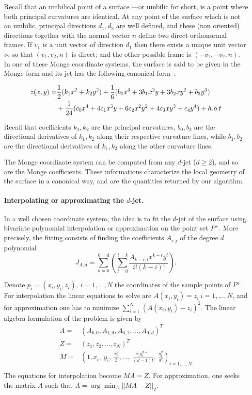Recall that an umbilical point of a surface ---or umbilic for short,
is a point where both principal curvatures are identical.  At any
point of the surface which is not an umbilic, principal directions
$d_1, d_2$ are well defined, and these (non oriented) directions
together with the normal vector $n$ define two direct orthonormal
frames. If $v_1$ is a unit vector of direction $d_1$ then there exists
a unique unit vector $v_2$ so that $(v_1,v_2,n)$ is direct; and the
other possible frame is $(-v_1,-v_2,n)$. In one of these Monge
coordinate systems, the surface is said to be given in the Monge form
and its jet has the following canonical form~:

\begin{eqnarray}
\label{eq:monge}
z(x,y) =  & \frac{1}{2}(k_1x^2 + k_2y^2)+
	\frac{1}{6}(b_0x^3+3b_1x^2y+3b_2xy^2+b_3y^3) \\
  &  +\frac{1}{24}(c_0x^4+4c_1x^3y+6c_2x^2y^2+4c_3xy^3+c_4y^4) + h.o.t
\end{eqnarray}

Recall that coefficients $k_1, k_2$ are the principal curvatures,
$b_0,b_3$ are the directional derivatives of $k_1,k_2$ along their
respective curvature lines, while $b_1,b_2$ are the directional
derivatives of $k_1,k_2$ along the other curvature lines.

The Monge coordinate system can be computed from any $d$-jet ($d\geq
2$), and so are the Monge coefficients. These informations
characterize the local geometry of the surface in a canonical way, and
are the quantities returned by our algorithm.

\paragraph{Interpolating or approximating the $d$-jet.}
%
In a well chosen coordinate system, the idea is to fit the $d$-jet of
the surface using bivariate polynomial interpolation or approximation
on the point set $P^+$.
%
More precisely, the fitting consists of finding the coefficients
$A_{i,j}$ of the degree $d$ polynomial 
\begin{equation}
\label{eq-answer}
J_{A,d}= \sum_{k=0}^{k=d}(\sum_{i=0}^{i=k}
\frac{A_{k-i,i}x^{k-i}y^{i}}{i!(k-i)!}).
\end{equation}


Denote $p_i=(x_i,y_i,z_i), \ i=1,\ldots , N$ the coordinates of the
sample points of $P^+$.
For interpolation the linear equations to solve are $A(x_i,y_i)=z_i \
i=1,\ldots,N$, and for approximation one has to minimize $\sum_{i=1}^N
(A(x_i,y_i)-z_i)^2$. The linear algebra formulation of the problem is
given by
%
\begin{eqnarray}
\label{eq:fit-linalg}
 A =  & (A_{0,0}, A_{1,0},A_{0,1}, \ldots , A_{0,d})^T \\ 
 Z=  &(z_1, z_2,\ldots , z_N)^T \\ 
 M=  &(1,x_i,\ y_i,\ \frac{x_i^2}{2},\ldots ,
\ \frac{x_iy_i^{d-1}}{(d-1)!},\ \frac{y_i^d}{d!})_{i=1,...,N}\\
\end{eqnarray}
%
The equations for interpolation become $MA=Z$. For approximation, one
seeks the matrix $A$ such that $A = \arg \min_A  ||MA-Z||_2$.

